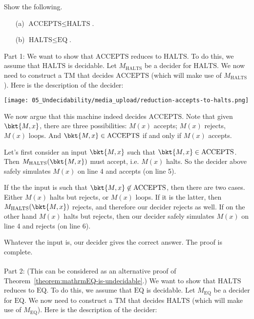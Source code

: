 \begin{flex}
\begin{exercise} \label{exercise:Practice-with-reduction-proofs}
Show the following.
\begin{enumerate}
    \item[(a)] $\text{ACCEPTS} \leq \text{HALTS}$.
    \item[(b)] $\text{HALTS} \leq \text{EQ}$.
\end{enumerate}
\end{exercise}

\begin{solution}
Part 1: We want to show that $\text{ACCEPTS}$ reduces to $\text{HALTS}$. To do this, we assume that $\text{HALTS}$ is decidable. Let $M_\text{HALTS}$ be a decider for $\text{HALTS}$. We now need to construct a TM that decides $\text{ACCEPTS}$ (which will make use of $M_\text{HALTS}$). Here is the description of the decider:

\begin{center}
\texttt{[image: 05\_Undecidability/media\_upload/reduction-accepts-to-halts.png]}
\end{center}

We now argue that this machine indeed decides $\text{ACCEPTS}$. Note that given $\bkt{M,x}$, there are three possibilities: $M(x)$ accepts; $M(x)$ rejects, $M(x)$ loops. And $\bkt{M,x} \in \text{ACCEPTS}$ if and only if $M(x)$ accepts. 

Let's first consider an input $\bkt{M,x}$ such that $\bkt{M,x} \in \text{ACCEPTS}$. Then $M_\text{HALTS}(\bkt{M,x})$ must accept, i.e. $M(x)$ halts. So the decider above safely simulates $M(x)$ on line 4 and accepts (on line 5).

If the the input is such that $\bkt{M,x} \not \in \text{ACCEPTS}$, then there are two cases. Either $M(x)$ halts but rejects, or $M(x)$ loops. If it is the latter, then $M_\text{HALTS}(\bkt{M,x})$ rejects, and therefore our decider rejects as well. If on the other hand $M(x)$ halts but rejects, then our decider safely simulates $M(x)$ on line 4 and rejects (on line 6).

Whatever the input is, our decider gives the correct answer. The proof is complete.
\\\\
\noindent
Part 2: (This can be considered as an alternative proof of Theorem~\ref{theorem:mathrmEQ-is-undecidable}.) We want to show that $\text{HALTS}$ reduces to $\text{EQ}$. To do this, we assume that $\text{EQ}$ is decidable. Let $M_\text{EQ}$ be a decider for $\text{EQ}$. We now need to construct a TM that decides $\text{HALTS}$ (which will make use of $M_\text{EQ}$). Here is the description of the decider:


\end{solution}
\end{flex}
